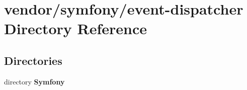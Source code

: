 \section{vendor/symfony/event-\/dispatcher Directory Reference}
\label{dir_6c6e75396b0ca5aedb1bb4f5e1e51605}
\subsection*{Directories}
\begin{DoxyCompactItemize}
\item 
directory {\bf Symfony}
\end{DoxyCompactItemize}
